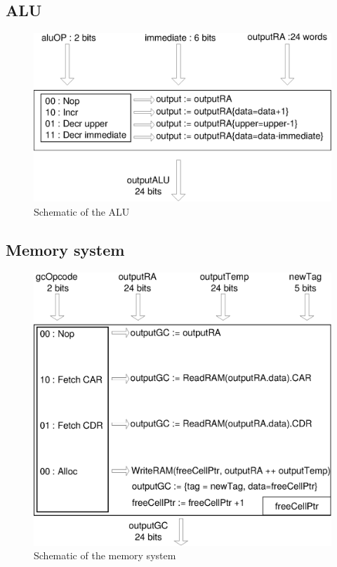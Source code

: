 \documentclass[a4paper, 11pt]{article}
\begin{document}
\subsection{ALU}
\begin{figure}[h]
\center
\caption{Schematic of the ALU}
   \includegraphics[scale=0.5]{ALU.eps}
\end{figure}

\newpage
\subsection{Memory system}
\begin{figure}[h]
\center
\caption{Schematic of the memory system}
   \includegraphics[scale=0.5]{GC.eps}
\end{figure}
\newpage
\end{document}
